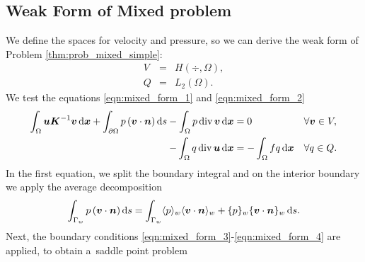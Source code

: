 \subsection{Weak Form of Mixed problem}
We define the spaces for velocity and pressure,
so we can derive the weak form of Problem \ref{thm:prob_mixed_simple}:
\begin{eqnarray}    
    V &=& H(\div,\Omega), \label{eqn:space_V}\\
    Q &=& L_2(\Omega). \label{eqn:space_Q}
\end{eqnarray}
We test the equations \eqref{eqn:mixed_form_1} and \eqref{eqn:mixed_form_2}
\begin{align}
    \int_\Omega \mathbf{\boldsymbol{u}} \mathbf{\boldsymbol{K}}^{-1} \mathbf{\boldsymbol{v}} \,{\rm d}\mathbf{\boldsymbol{x}}
    + \int_{\partial\Omega} p \,(\mathbf{\boldsymbol{v}} \cdot \mathbf{\boldsymbol{n}}) \,{\rm d} s
    - \int_\Omega p\,{\rm div}\, \mathbf{\boldsymbol{v}} \,{\rm d}\mathbf{\boldsymbol{x}} &= 0 && \forall \mathbf{\boldsymbol{v}}\in V, \label{eqn:mixed_weak_1}\\
    - \int_\Omega q\,{\rm div}\, \mathbf{\boldsymbol{u}} \,{\rm d}\mathbf{\boldsymbol{x}} &= - \int_\Omega fq \,{\rm d}\mathbf{\boldsymbol{x}} &&  \forall q\in Q. \label{eqn:mixed_weak_2}
\end{align}
%
In the first equation, we split the boundary integral and on the interior boundary we apply the average decomposition
\begin{align}
    \int_{\Gamma_w} p \,(\mathbf{\boldsymbol{v}} \cdot \mathbf{\boldsymbol{n}}) \,{\rm d} s
    = \int_{\Gamma_w} \langle p\rangle_w \langle\mathbf{\boldsymbol{v}} \cdot \mathbf{\boldsymbol{n}}\rangle_w + \{p\}_w \{\mathbf{\boldsymbol{v}} \cdot \mathbf{\boldsymbol{n}}\}_w \,{\rm d} s.
\end{align}
Next, the boundary conditions \eqref{eqn:mixed_form_3}-\eqref{eqn:mixed_form_4} are applied, 
to obtain a~saddle point problem
%
